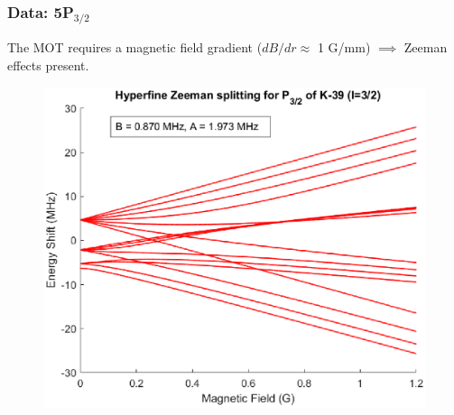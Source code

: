 \documentclass{beamer}
\theoremstyle{definition}
\begin{document}
\begin{frame}
\frametitle{Data: 5P$_{\text{3/2}}$}

The MOT requires a magnetic field gradient ($dB/dr \approx$ 1 G/mm) $\implies$ Zeeman effects present.



\begin{figure}[!htb]
	\centering
	\includegraphics[height=0.7\textheight]{Zeeman_hfs.eps}
\end{figure}
\end{frame}
\end{document}
